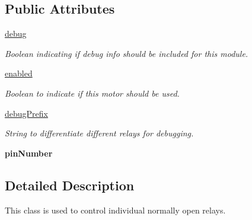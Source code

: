 \subsection*{Public Attributes}
\begin{DoxyCompactItemize}
\item 
\mbox{\label{classtest_1_1routines_1_1test1_1_1RelayControl_1_1RelayControl_a1527097258deb38fcfad0e24c3c4c192}} 
\hyperlink{classtest_1_1routines_1_1test1_1_1RelayControl_1_1RelayControl_a1527097258deb38fcfad0e24c3c4c192}{debug}
\begin{DoxyCompactList}\small\item\em Boolean indicating if debug info should be included for this module. \end{DoxyCompactList}\item 
\hyperlink{classtest_1_1routines_1_1test1_1_1RelayControl_1_1RelayControl_ad45edce55069af8a6ae4d3ba866243ab}{enabled}
\begin{DoxyCompactList}\small\item\em Boolean to indicate if this motor should be used. \end{DoxyCompactList}\item 
\mbox{\label{classtest_1_1routines_1_1test1_1_1RelayControl_1_1RelayControl_a0a9fee2b69676fa022cd17c0b37cf2bc}} 
\hyperlink{classtest_1_1routines_1_1test1_1_1RelayControl_1_1RelayControl_a0a9fee2b69676fa022cd17c0b37cf2bc}{debug\+Prefix}
\begin{DoxyCompactList}\small\item\em String to differentiate different relays for debugging. \end{DoxyCompactList}\item 
\mbox{\label{classtest_1_1routines_1_1test1_1_1RelayControl_1_1RelayControl_a769306442e72064120a41e59be7336d3}} 
{\bfseries pin\+Number}
\end{DoxyCompactItemize}


\subsection{Detailed Description}
This class is used to control individual normally open relays. 

